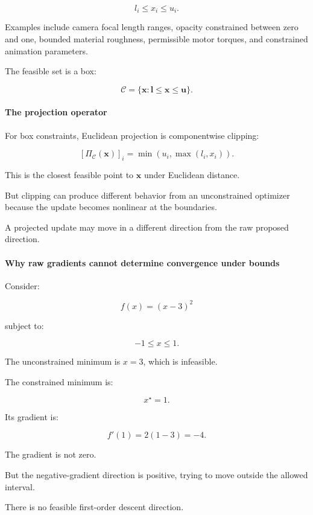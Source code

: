 \[
l_i\le x_i\le u_i.
\]

Examples include camera focal length ranges, opacity constrained between zero and one, bounded material roughness, permissible motor torques, and constrained animation parameters.

The feasible set is a box:

\[
\mathcal C= \{\mathbf x:\mathbf l\le\mathbf x\le\mathbf u\}.
\]

\paragraph{The projection operator}\label{02-foundations-ii-ch027-the-projection-operator}

For box constraints, Euclidean projection is componentwise clipping:

\[
\boxed{ [\Pi_{\mathcal C}(\mathbf x)]_i = \min(u_i,\max(l_i,x_i)) }.
\]

This is the closest feasible point to \(\mathbf x\) under Euclidean distance.

But clipping can produce different behavior from an unconstrained optimizer because the update becomes nonlinear at the boundaries.

A projected update may move in a different direction from the raw proposed direction.

\paragraph{Why raw gradients cannot determine convergence under bounds}\label{02-foundations-ii-ch027-why-raw-gradients-cannot-determine-convergence-under-bounds}

Consider:

\[
f(x)=(x-3)^2
\]

subject to:

\[
-1\le x\le1.
\]

The unconstrained minimum is \(x=3\), which is infeasible.

The constrained minimum is:

\[
\boxed{x^\star=1}.
\]

Its gradient is:

\[
f'(1)=2(1-3)=-4.
\]

The gradient is not zero.

But the negative-gradient direction is positive, trying to move outside the allowed interval.

There is no feasible first-order descent direction.

